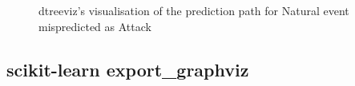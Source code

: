 \begin{figure}[tb]
    \centering
    \caption{dtreeviz's visualisation of the prediction path for Natural event mispredicted as Attack}
    \label{fig:dtreeviz}
\end{figure}

\subsection{scikit-learn export\_graphviz}